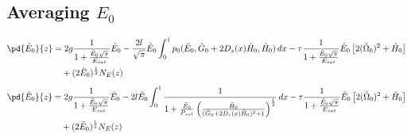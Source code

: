\subsection{Averaging $E_0$}
\begin{equation}
\begin{split}
\pd{\tilde{E}_0}{z} &= 2g \frac{1}{1+\frac{\tilde{E}_0\sqrt{\pi}}{E_{sat}}} \tilde{E}_0 - \frac{2l}{\sqrt{\pi}}\tilde{E}_0  \int_{0}^{1} p_0(\tilde{E}_0,\tilde{G}_0 + 2 D_s(x) \tilde{H}_0,\tilde{H}_0) \,dx - \tau \frac{1}{1+\frac{\tilde{E}_0\sqrt{\pi}}{E_{sat}}} \tilde{E}_0 \left[2 (\tilde{\Omega}_0)^2 + \tilde{H}_0\right] \\
&\quad+ (2\tilde{E}_0)^{\frac{1}{2}}N_E(z) \\
\end{split}
\end{equation}
\begin{equation}
\begin{split}
\pd{\tilde{E}_0}{z} &= 2g \frac{1}{1+\frac{\tilde{E}_0\sqrt{\pi}}{E_{sat}}} \tilde{E}_0 - 2l\tilde{E}_0  \int_{0}^{1} \frac{1}{1+\frac{\tilde{E}_0}{P_{sat}}\left(\frac{\tilde{H}_0}{(\tilde{G}_0 + 2 D_s(x) \tilde{H}_0)^2+1}\right)^{\frac{1}{2}}} \,dx - \tau \frac{1}{1+\frac{\tilde{E}_0\sqrt{\pi}}{E_{sat}}} \tilde{E}_0 \left[2 (\tilde{\Omega}_0)^2 + \tilde{H}_0\right] \\
&\quad+ (2\tilde{E}_0)^{\frac{1}{2}}N_E(z) \\
\end{split}
\end{equation}